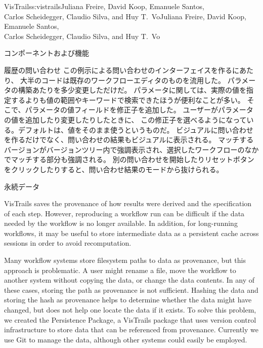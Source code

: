 \begin{aosachaptertoc}{VisTrails}{s:vistrails}{Juliana Freire, David Koop, Emanuele Santos, \\ Carlos Scheidegger, Claudio Silva, and Huy T.\ Vo}{Juliana Freire, David Koop, Emanuele Santos, \\ \hspace*{0.9cm} Carlos Scheidegger, Claudio Silva, and Huy T.\ Vo}
\begin{aosasect1}{コンポーネントおよび機能}
\begin{aosasect2}{履歴の問い合わせ}
この例示による問い合わせのインターフェイスを作るにあたり、
大半のコードは既存のワークフローエディタのものを流用した。
パラメータの構築あたりを多少変更しただけだ。
パラメータに関しては、実際の値を指定するよりも値の範囲やキーワードで検索できたほうが便利なことが多い。
そこで、パラメータの値フィールドを修正子を追加した。
ユーザーがパラメータの値を追加したり変更したりしたときに、
この修正子を選べるようになっている。デフォルトは、値をそのまま使うというものだ。
ビジュアルに問い合わせを作るだけでなく、問い合わせの結果もビジュアルに表示される。
マッチするバージョンがバージョンツリー内で強調表示され、選択したワークフローのなかでマッチする部分も強調される。
別の問い合わせを開始したりリセットボタンをクリックしたりすると、問い合わせ結果のモードから抜けられる。

\end{aosasect2}

\begin{aosasect2}{永続データ}

VisTrails saves the provenance of how results were derived and the
specification of each step. However, reproducing a workflow run can be
difficult if the data needed by the workflow is no longer available.
In addition, for long-running workflows, it may be useful to store
intermediate data as a persistent cache across sessions in order to
avoid recomputation.

Many workflow systems store filesystem paths to data as provenance,
but this approach is problematic.  A user might rename a file, move
the workflow to another system without copying the data, or change the
data contents.  In any of these cases, storing the path as provenance
is not sufficient.  Hashing the data and storing
the hash as provenance helps to determine whether the data might have
changed, but does not help one locate the data if it exists.  To solve
this problem, we created the Persistence Package, a VisTrails package
that uses version control infrastructure to store data that can be
referenced from provenance.  Currently we use Git to manage the data,
although other systems could easily be employed.


\end{aosasect2}
\end{aosasect1}
\end{aosachaptertoc}
